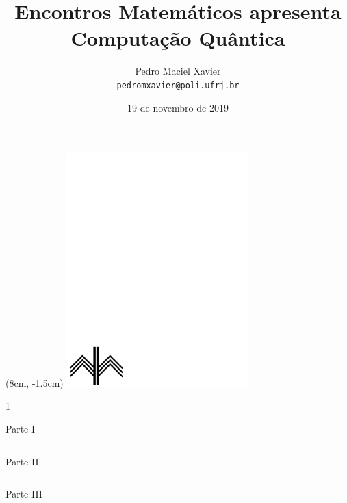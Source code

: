 \documentclass[t]{beamer}
\title{
	{{\Large \textbf{Encontros Matemáticos}} {\small 	apresenta}}\\
\vspace{30pt}
{\huge Computação Quântica}
}
\institute{IM-UFRJ}
\date{19 de novembro de 2019}
\author{Pedro Maciel Xavier \\ \texttt{pedromxavier@poli.ufrj.br}}
\begin{document}
	\begin{frame}
		\titlepage
		\begin{textblock*}{7cm}(8cm, -1.5cm)
			\includegraphics[width=7cm]{im.pdf}
		\end{textblock*}
1	\end{frame}
	
	\begin{frame}{Parte I}
	\begin{columns}[t]
        \begin{column}{.5\textwidth}
            \tableofcontents[sections={1}]
        \end{column}
        \begin{column}{.5\textwidth}
            \tableofcontents[sections={2}]
        \end{column}
    \end{columns}
    \end{frame}

    \begin{frame}{Parte II}
    \begin{columns}[t]
        \begin{column}{.5\textwidth}
            \tableofcontents[sections={3}]
        \end{column}
        \begin{column}{.5\textwidth}
            \tableofcontents[sections={4-5}]
        \end{column}
    \end{columns}
	\end{frame}

    \begin{frame}{Parte III}
  		\tableofcontents[sections={6-}]
	\end{frame}
	
\end{document}
